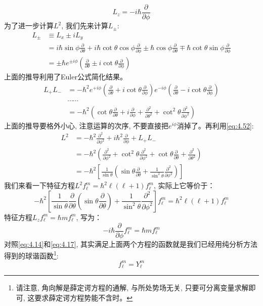 \documentclass[a4paper,zihao=-4,linespread=1]{ctexrep}
\begin{document}
    \begin{equation}
        \label{eq:4.55}
        \boxed{
            L_z = -i\hbar\frac{\partial}{\partial\phi}
        }
    \end{equation}
    为了进一步计算$L^2$, 我们先来计算$L_\pm$:
    \begin{align*}
        L_\pm&\equiv L_x\pm iL_y\\
             &=i\hbar\sin\phi\frac{\partial}{\partial\theta}+i\hbar\cot\theta\cos\phi\frac{\partial}{\partial\phi}\pm\hbar\cos\phi\frac{\partial}{\partial\theta}\mp\hbar\cot\theta\sin\phi\frac{\partial}{\partial\phi}\\
             &=\pm\hbar e^{\pm i\phi}\left(\frac{\partial}{\partial\theta}\pm i\cot\theta\frac{\partial}{\partial\phi}\right)
    \end{align*}
    上面的推导利用了Euler公式简化结果。
    \begin{align*}
        L_+L_-&=-\hbar^2 e^{+i\phi}\left(\frac{\partial}{\partial\theta}+ i\cot\theta\frac{\partial}{\partial\phi}\right)e^{- i\phi}\left(\frac{\partial}{\partial\theta}-i\cot\theta\frac{\partial}{\partial\phi}\right)\\
              &\cdots\cdots\\
              &=-\hbar^2 \left(\cot\theta\frac{\partial}{\partial \theta}+i\frac{\partial}{\partial\phi}+\frac{\partial^2}{\partial\theta^2}+\cot^2\theta\frac{\partial^2}{\partial\phi^2}\right)
    \end{align*}
    上面的推导要格外小心, 注意运算的次序, 不要直接把$e^{i\phi}$消掉了。再利用\ref{eq:4.52}:
    \begin{align*}
        L^2&=-\hbar^2\frac{\partial^2}{\partial\phi^2}+i\hbar^2\frac{\partial}{\partial\phi}+L_+L_-\\
           &=-\hbar^2\left(\frac{\partial^2}{\partial\phi^2}+\cot^2\theta\frac{\partial^2}{\partial\phi^2}+\cot\theta\frac{\partial}{\partial\theta}+\frac{\partial^2}{\partial\theta^2}\right)\\
           &=-\hbar^2\left[\frac{1}{\sin\theta}\left(\sin\theta\frac{\partial}{\partial\theta}+\frac{1}{\sin^2\theta}\frac{\partial^2}{\partial\phi^2}\right)\right]
    \end{align*}
    我们来看一下特征方程$L^2f_\ell^m=\hbar^2\ell\left(\ell+1\right)f_\ell^m$, 实际上它等价于：
    \begin{equation}
        -\hbar^2\left[\frac{1}{\sin\theta}\frac{\partial}{\partial\theta}\left(\sin\theta\frac{\partial}{\partial\theta}\right)+\frac{1}{\sin^2\theta}\frac{\partial^2}{\partial\phi^2}\right]f_\ell^m=\hbar^2\ell\left(\ell+1\right)f_\ell^m
    \end{equation}
    特征方程$L_zf_\ell^m=\hbar mf_\ell^m$, 写为：
    \begin{equation}
        -i\hbar\frac{\partial}{\partial\phi}f_\ell^m=\hbar mf_\ell^m
    \end{equation}
    对照\ref{eq:4.14}和\ref{eq:4.17}, 其实满足上面两个方程的函数就是我们已经用纯分析方法得到的球谐函数\footnote{请注意, 角向解是薛定谔方程的通解, 与所处势场无关, 只要可分离变量求解即可, 这要求薛定谔方程势能不含时。}:
    \[f_\ell^m=Y_\ell^m\]
\end{document}
